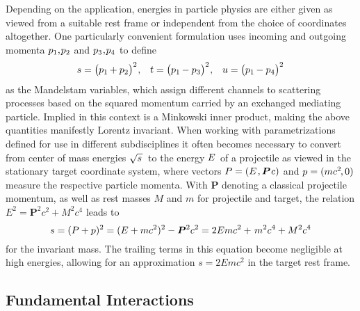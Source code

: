 Depending on the application, energies in particle physics are either given as viewed from a suitable rest frame or independent from
the choice of coordinates altogether. One particularly convenient formulation uses incoming and outgoing momenta
$p_1 , \kern-1.0pt p_2$ and $p_3 \kern+0.5pt , \kern-1.0pt p_4$ to define
\begin{align*}
	s = \bigl( p_1 \kern-0.5pt + p_2 \bigr)^2 \kern+0.5pt , &&
	t = \bigl( p_1 \kern-0.5pt - p_3 \bigr)^2 \kern+0.5pt , &&
	u = \bigl( p_1 \kern-0.5pt - p_4 \bigr)^2
\end{align*}
as the Mandelstam variables, which assign different channels to scattering processes based on the squared momentum carried by an
exchanged mediating particle. Implied in this context is a Minkowski inner product, making the above quantities manifestly Lorentz
invariant.
{\newpage}
When working with parametrizations defined for use in different subdisciplines it often becomes necessary to convert from center
of mass energies $\sqrt{s \kern+1.0pt} \kern+1.0pt$ to the energy $\kern-0.5pt E \kern+1.0pt$ of a projectile as viewed in the
stationary target coordinate system, where vectors $P = (E \kern+1.0pt , \bm{P} \kern+0.75pt c)$ and $p = (m c^2 \kern-1.0pt , 0)$
measure the respective particle momenta. With $\bm{P}$ denoting a classical projectile momentum, as well as rest masses $M$ and $m$
for projectile and target, the relation $E^2 = \bm{P}^2 c^2 + M^2 c^4$ leads to
\begin{equation*}
	s = (P + p)^2 = (E + m c^2)^2 - \bm{P}^2 c^2 = 2E m c^2 + \kern+1.0pt m^2 c^4 + M^2 c^4
\end{equation*}
for the invariant mass. The trailing terms in this equation become negligible at high energies, allowing for an approximation
$s = 2E m c^2$ in the target rest frame.



\subsection{Fundamental Interactions}
\label{sub:interactions}

